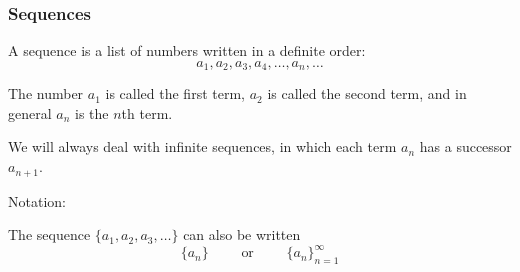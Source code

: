 \begin{frame}
\frametitle{Sequences}
\begin{definition}[Sequence]
A sequence is a list of numbers written in a definite order:
\[
a_1, a_2, a_3, a_4, \ldots , a_n , \ldots
\]

The number $a_1$ is called the first term, $a_2$ is called the second term, and in general $a_n$ is the $n$th term.

We will always deal with infinite sequences, in which each term $a_n$ has a successor $a_{n+1}$.
\end{definition}

Notation:

The sequence $\{ a_1, a_2, a_3, \ldots \}$ can also be written
\[
\{ a_n\} \qquad \textrm{ or }\qquad \{ a_n\}_{n = 1}^\infty
\]
\end{frame}
